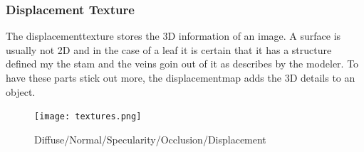 \subsubsection*{Displacement Texture}
The displacementtexture stores the 3D information of an image. A surface is usually not 2D and in the case of a leaf it is certain that it has a structure defined my the stam and the veins goin out of it as describes by the modeler. To have these parts stick out more, the displacementmap adds the 3D details to an object.
\begin{figure}[h]
	\centering
	\texttt{[image: textures.png]}
	\caption{Diffuse/Normal/Specularity/Occlusion/Displacement}
	\label{textures}
\end{figure}
